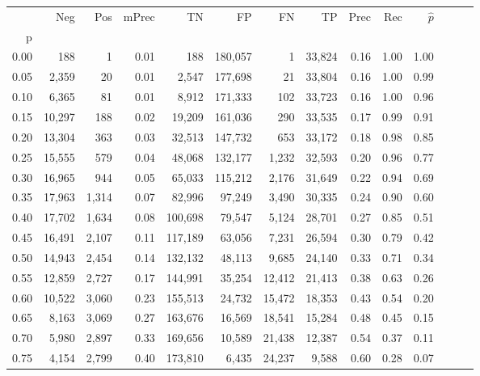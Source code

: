 \begin{tabular}{rrrrrrrrrrrrrr}
\toprule
{} &     Neg &    Pos & mPrec &       TN &       FP &      FN &      TP &  Prec &   Rec & $\hat{p}$ \\
p    &         &        &       &          &          &         &         &       &       &           \\
\midrule
0.00 &     188 &      1 &  0.01 &      188 &  180,057 &       1 &  33,824 &  0.16 &  1.00 &      1.00 \\
0.05 &   2,359 &     20 &  0.01 &    2,547 &  177,698 &      21 &  33,804 &  0.16 &  1.00 &      0.99 \\
0.10 &   6,365 &     81 &  0.01 &    8,912 &  171,333 &     102 &  33,723 &  0.16 &  1.00 &      0.96 \\
0.15 &  10,297 &    188 &  0.02 &   19,209 &  161,036 &     290 &  33,535 &  0.17 &  0.99 &      0.91 \\
0.20 &  13,304 &    363 &  0.03 &   32,513 &  147,732 &     653 &  33,172 &  0.18 &  0.98 &      0.85 \\
0.25 &  15,555 &    579 &  0.04 &   48,068 &  132,177 &   1,232 &  32,593 &  0.20 &  0.96 &      0.77 \\
0.30 &  16,965 &    944 &  0.05 &   65,033 &  115,212 &   2,176 &  31,649 &  0.22 &  0.94 &      0.69 \\
0.35 &  17,963 &  1,314 &  0.07 &   82,996 &   97,249 &   3,490 &  30,335 &  0.24 &  0.90 &      0.60 \\
0.40 &  17,702 &  1,634 &  0.08 &  100,698 &   79,547 &   5,124 &  28,701 &  0.27 &  0.85 &      0.51 \\
0.45 &  16,491 &  2,107 &  0.11 &  117,189 &   63,056 &   7,231 &  26,594 &  0.30 &  0.79 &      0.42 \\
0.50 &  14,943 &  2,454 &  0.14 &  132,132 &   48,113 &   9,685 &  24,140 &  0.33 &  0.71 &      0.34 \\
0.55 &  12,859 &  2,727 &  0.17 &  144,991 &   35,254 &  12,412 &  21,413 &  0.38 &  0.63 &      0.26 \\
0.60 &  10,522 &  3,060 &  0.23 &  155,513 &   24,732 &  15,472 &  18,353 &  0.43 &  0.54 &      0.20 \\
0.65 &   8,163 &  3,069 &  0.27 &  163,676 &   16,569 &  18,541 &  15,284 &  0.48 &  0.45 &      0.15 \\
0.70 &   5,980 &  2,897 &  0.33 &  169,656 &   10,589 &  21,438 &  12,387 &  0.54 &  0.37 &      0.11 \\
0.75 &   4,154 &  2,799 &  0.40 &  173,810 &    6,435 &  24,237 &   9,588 &  0.60 &  0.28 &      0.07 \\

\end{tabular}
